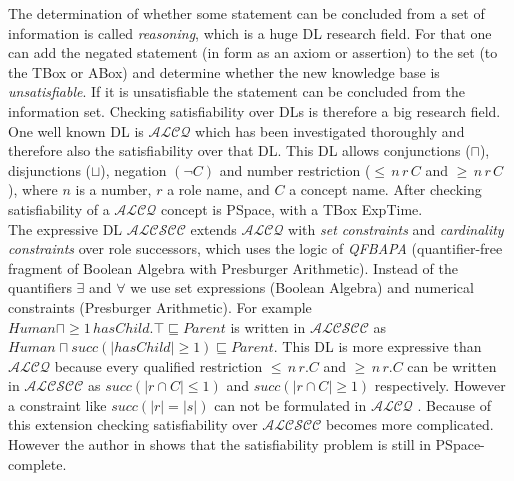 \documentclass{book}
\theoremstyle{break}
\theoremstyle{definition}
\begin{document}
The determination of whether some statement can be concluded from a set of information is called \textit{reasoning}, which is a huge DL research field. For that one can add the negated statement (in form as an axiom or assertion) to the set (to the TBox or ABox) and determine whether the new knowledge base is \textit{unsatisfiable}. If it is unsatisfiable the statement can be concluded from the information set. Checking satisfiability over DLs is therefore a big research field. One well known DL is $\mathcal{ALCQ}$ \cite{1}\cite{6} which has been investigated thoroughly and therefore also the satisfiability over that DL. This DL allows conjunctions ($\sqcap$), disjunctions ($\sqcup$), negation $(\neg C)$ and number restriction ($\leq\,n\,r\, C$ and $\geq \, n\, r\, C$), where $n$ is a number, $r$ a role name, and $C$ a concept name. After \cite{1} checking satisfiability of a $\mathcal{ALCQ}$ concept is PSpace, with a TBox ExpTime.\\
The expressive DL $\mathcal{ALCSCC}$ \cite{4} extends $\mathcal{ALCQ}$ with \textit{set constraints} and \textit{cardinality constraints} over role successors, which uses the logic of \textit{QFBAPA} (quantifier-free fragment of Boolean Algebra with Presburger Arithmetic)\cite{KuncakRinard}. Instead of the quantifiers $\exists$ and $\forall$ we use set expressions (Boolean Algebra) and numerical constraints (Presburger Arithmetic). For example $Human \sqcap \geq 1\,hasChild.\top\sqsubseteq Parent$ is written in $\mathcal{ALCSCC}$ as $Human\sqcap succ(|hasChild|\geq 1)\sqsubseteq Parent$. This DL is more expressive than $\mathcal{ALCQ}$ because every qualified restriction $\leq\,n\,r.C$ and $\geq \, n\, r.C$ can be written in $\mathcal{ALCSCC}$ as $succ(|r\cap C|\leq 1)$ and $succ(|r\cap C|\geq 1)$ respectively. However a constraint like $succ(|r|=|s|)$ can not be formulated in $\mathcal{ALCQ}$ \cite{4}. Because of this extension checking satisfiability over $\mathcal{ALCSCC}$ becomes more complicated. However the author in \cite{4} shows that the satisfiability problem is still in PSpace-complete.\\
\end{document}
